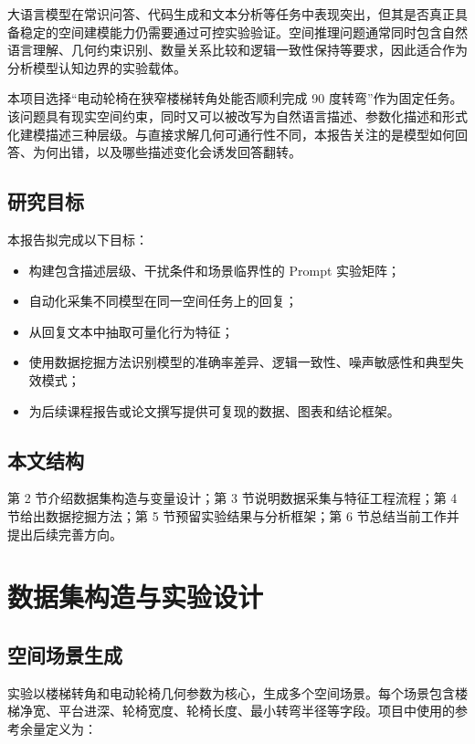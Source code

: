 \documentclass{BJUTReport}
\begin{document}
大语言模型在常识问答、代码生成和文本分析等任务中表现突出，但其是否真正具备稳定的空间建模能力仍需要通过可控实验验证。空间推理问题通常同时包含自然语言理解、几何约束识别、数量关系比较和逻辑一致性保持等要求，因此适合作为分析模型认知边界的实验载体。

本项目选择“电动轮椅在狭窄楼梯转角处能否顺利完成 90 度转弯”作为固定任务。该问题具有现实空间约束，同时又可以被改写为自然语言描述、参数化描述和形式化建模描述三种层级。与直接求解几何可通行性不同，本报告关注的是模型如何回答、为何出错，以及哪些描述变化会诱发回答翻转。

\subsection{研究目标}

本报告拟完成以下目标：

\begin{itemize}
    \item 构建包含描述层级、干扰条件和场景临界性的 Prompt 实验矩阵；
    \item 自动化采集不同模型在同一空间任务上的回复；
    \item 从回复文本中抽取可量化行为特征；
    \item 使用数据挖掘方法识别模型的准确率差异、逻辑一致性、噪声敏感性和典型失效模式；
    \item 为后续课程报告或论文撰写提供可复现的数据、图表和结论框架。
\end{itemize}

\subsection{本文结构}

第 2 节介绍数据集构造与变量设计；第 3 节说明数据采集与特征工程流程；第 4 节给出数据挖掘方法；第 5 节预留实验结果与分析框架；第 6 节总结当前工作并提出后续完善方向。

\section{数据集构造与实验设计}

\subsection{空间场景生成}

实验以楼梯转角和电动轮椅几何参数为核心，生成多个空间场景。每个场景包含楼梯净宽、平台进深、轮椅宽度、轮椅长度、最小转弯半径等字段。项目中使用的参考余量定义为：
\end{document}
